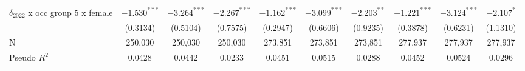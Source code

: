 \begin{tabular}{l|ccc|ccc|ccc}
$\delta_{2022}$ x occ group 5 x female &          $-1.530^{***}$ &  $-3.264^{***}$ &  $-2.267^{***}$ &           $-1.162^{***}$ &  $-3.099^{***}$ &   $-2.203^{**}$ &           $-1.221^{***}$ &  $-3.124^{***}$ &      $-2.107^*$ \\
                                       &                (0.3134) &        (0.5104) &        (0.7575) &                 (0.2947) &        (0.6606) &        (0.9235) &                 (0.3878) &        (0.6231) &        (1.1310) \\
N                                      &                 250,030 &         250,030 &         250,030 &                  273,851 &         273,851 &         273,851 &                  277,937 &         277,937 &         277,937 \\
Pseudo $R^2$                           &                  0.0428 &          0.0442 &          0.0233 &                   0.0451 &          0.0515 &          0.0288 &                   0.0452 &          0.0524 &          0.0296 \\
\bottomrule
\end{tabular}
